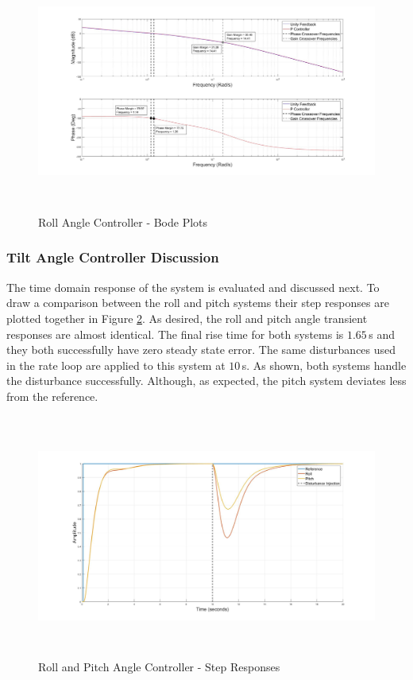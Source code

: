 		\begin{figure}[H]
			\centering
			\includegraphics[height = 8cm]{../Design/Matlab/Controllers/roll_angle_bode.jpg}
			\caption{Roll Angle Controller -  Bode Plots}
			\label{IM_RollAngleControlBode}
		\end{figure}
	
		\subsubsection{Tilt Angle Controller Discussion}
		The time domain response of the system is evaluated and discussed next. To draw a comparison between the roll and pitch systems their step responses are plotted together in Figure \ref{IM_RollAngleStep}. As desired, the roll and pitch angle transient responses are almost identical. The final rise time for both systems is $1.65$\,s and they both successfully have zero steady state error. The same disturbances used in the rate loop are applied to this system at $10$\,s. As shown, both systems handle the disturbance successfully. Although, as expected, the pitch system deviates less from the reference.
		
		\begin{figure}[H]
			\centering
			\includegraphics[height = 8cm]{../Design/Matlab/Controllers/roll_pitch_angle_step.jpg}
			\caption{Roll and Pitch Angle Controller -  Step Responses}
			\label{IM_RollAngleStep}
		\end{figure}
		
